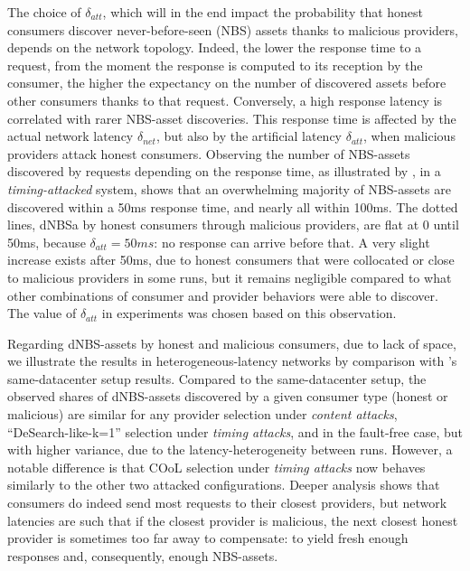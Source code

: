 The choice of $\delta_{att}$, which will in the end impact the probability that honest consumers discover never-before-seen (NBS) assets thanks to malicious providers, depends on the network topology. 
Indeed, the lower the response time to a request, from the moment the response is computed to its reception by the consumer, the higher the expectancy on the number of discovered assets before other consumers thanks to that request. 
Conversely, a high response latency is correlated with rarer NBS-asset discoveries. 
This response time is affected by the actual network latency $\delta_{net}$, but also by the artificial latency $\delta_{att}$, when malicious providers attack honest consumers.
Observing the number of NBS-assets discovered by requests depending on the response time, as illustrated by , in a \emph{timing-attacked} system, 
shows that an overwhelming majority of NBS-assets are discovered within a 50ms response time, and nearly all within 100ms. 
The dotted lines, dNBSa by honest consumers through malicious providers, are flat at 0 until 50ms, because $\delta_{att}=50ms$: no response can arrive before that. 
A very slight increase exists after 50ms, due to honest consumers that were collocated or close to malicious providers in some runs, 
but it remains negligible compared to what other combinations of consumer and provider behaviors were able to discover.
The value of $\delta_{att}$ in experiments was chosen based on this observation.

Regarding dNBS-assets by honest and malicious consumers, due to lack of space, we illustrate the results in heterogeneous-latency networks by comparison with 's same-datacenter setup results.
Compared to the same-datacenter setup, the observed shares of dNBS-assets discovered by a given consumer type (honest or malicious) are similar for any provider selection under \emph{content attacks}, ``DeSearch-like-k=1'' selection under \emph{timing attacks}, and in the fault-free case, but with higher variance, due to the latency-heterogeneity between runs. 
However, a notable difference is that COoL selection under \emph{timing attacks} now behaves similarly to the other two attacked configurations. 
Deeper analysis shows that consumers do indeed send most requests to their closest providers, but network latencies are such that if the closest provider is malicious, the next closest honest provider is sometimes too far away to compensate: to yield fresh enough responses and, consequently, enough NBS-assets. 

